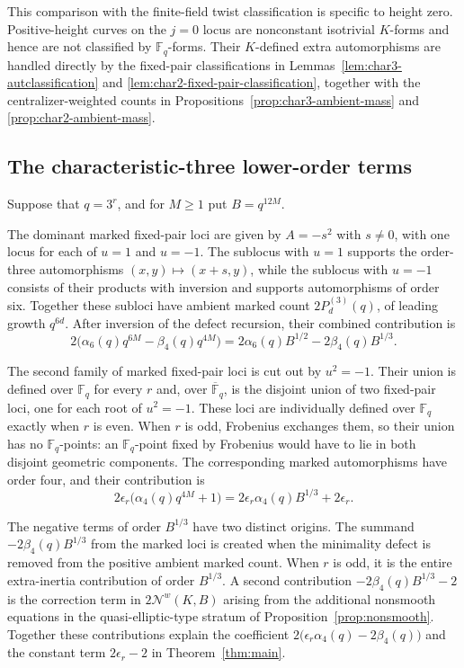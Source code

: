 \documentclass[a4paper,12pt]{amsart}
\theoremstyle{definition}
\newcommand{\Fb}{\mathbb{F}}
\newcommand{\Nc}{\mathcal{N}}
\begin{document}
This comparison with the finite-field twist classification is specific to height zero.  Positive-height curves on the $j=0$ locus are nonconstant isotrivial $K$-forms and hence are not classified by $\Fb_q$-forms.  Their $K$-defined extra automorphisms are handled directly by the fixed-pair classifications in Lemmas~\ref{lem:char3-autclassification} and \ref{lem:char2-fixed-pair-classification}, together with the centralizer-weighted counts in Propositions~\ref{prop:char3-ambient-mass} and \ref{prop:char2-ambient-mass}.

\subsection{The characteristic-three lower-order terms}

Suppose that $q=3^r$, and for $M\geq1$ put $B=q^{12M}$.

The dominant marked fixed-pair loci are given by $A=-s^2$ with $s\neq0$, with one locus for each of $u=1$ and $u=-1$.  The sublocus with $u=1$ supports the order-three automorphisms $(x,y)\mapsto(x+s,y)$, while the sublocus with $u=-1$ consists of their products with inversion and supports automorphisms of order six.  Together these subloci have ambient marked count $2P_d^{(3)}(q)$, of leading growth $q^{6d}$.  After inversion of the defect recursion, their combined contribution is
\[
2\bigl(\alpha_6(q)q^{6M}-\beta_4(q)q^{4M}\bigr)
=
2\alpha_6(q)B^{1/2}-2\beta_4(q)B^{1/3}.
\]

The second family of marked fixed-pair loci is cut out by $u^2=-1$.  Their union is defined over $\Fb_q$ for every $r$ and, over $\overline{\Fb}_q$, is the disjoint union of two fixed-pair loci, one for each root of $u^2=-1$.  These loci are individually defined over $\Fb_q$ exactly when $r$ is even.  When $r$ is odd, Frobenius exchanges them, so their union has no $\Fb_q$-points: an $\Fb_q$-point fixed by Frobenius would have to lie in both disjoint geometric components.  The corresponding marked automorphisms have order four, and their contribution is
\[
2\epsilon_r\bigl(\alpha_4(q)q^{4M}+1\bigr)
=
2\epsilon_r\alpha_4(q)B^{1/3}+2\epsilon_r.
\]

The negative terms of order $B^{1/3}$ have two distinct origins.  The summand $-2\beta_4(q)B^{1/3}$ from the marked loci is created when the minimality defect is removed from the positive ambient marked count.  When $r$ is odd, it is the entire extra-inertia contribution of order $B^{1/3}$.  A second contribution $-2\beta_4(q)B^{1/3}-2$ is the correction term in $2\Nc^w(K,B)$ arising from the additional nonsmooth equations in the quasi-elliptic-type stratum of Proposition~\ref{prop:nonsmooth}.  Together these contributions explain the coefficient $2\bigl(\epsilon_r\alpha_4(q)-2\beta_4(q)\bigr)$ and the constant term $2\epsilon_r-2$ in Theorem~\ref{thm:main}.
\end{document}
